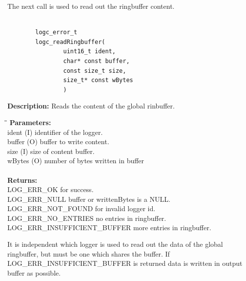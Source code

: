 \documentclass[a4paper, titlepage, 11pt]{article}
\begin{document}
\newpage
The next call is used to read out the ringbuffer content. \\ \\
\small
\begin{verbatim}
        logc_error_t
        logc_readRingbuffer(
                uint16_t ident,
                char* const buffer,
                const size_t size,
                size_t* const wBytes
                )
\end{verbatim}
\normalsize
\textbf{Description:} Reads the content of the global rinbuffer.
\begin{tabbing}
\hspace*{1cm}\=\hspace*{2cm}\=\hspace*{0,6cm}\= \kill
\textbf{Parameters:} \\
\> ident \> (I) identifier of the logger. \\
\> buffer \> (O) buffer to write content. \\
\> size \> (I) size of content buffer. \\
\> wBytes \> (O) number of bytes written in buffer \\ \\
\textbf{Returns:} \\
\> LOG\_ERR\_OK for success. \\
\> LOG\_ERR\_NULL buffer or writtenBytes is a NULL. \\
\> LOG\_ERR\_NOT\_FOUND for invalid logger id. \\
\> LOG\_ERR\_NO\_ENTRIES no entries in ringbuffer. \\
\> LOG\_ERR\_INSUFFICIENT\_BUFFER more entries in ringbuffer. \\
\end{tabbing}
It is independent which logger is used to read out the data of the global
ringbuffer, but must be one which shares the buffer. If
LOG\_ERR\_INSUFFICIENT\_BUFFER is returned data is written in output buffer as
possible.

\newpage
\end{document}
